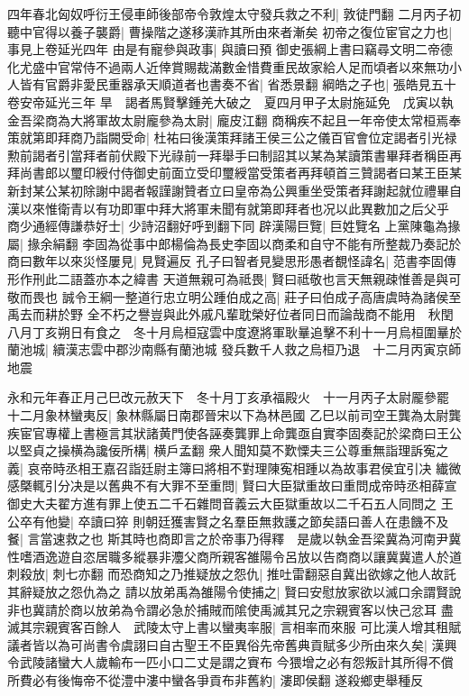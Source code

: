 四年春北匈奴呼衍王侵車師後部帝令敦煌太守發兵救之不利|{
	敦徒門翻}
二月丙子初聽中官得以養子襲爵|{
	曹操階之遂移漢祚其所由來者漸矣}
初帝之復位宦官之力也|{
	事見上卷延光四年}
由是有寵參與政事|{
	與讀曰預}
御史張綱上書曰竊尋文明二帝德化尤盛中官常侍不過兩人近倖賞賜裁滿數金惜費重民故家給人足而頃者以來無功小人皆有官爵非愛民重器承天順道者也書奏不省|{
	省悉景翻}
綱皓之子也|{
	張皓見五十卷安帝延光三年}
旱　謁者馬賢擊鍾羌大破之　夏四月甲子太尉施延免　戊寅以執金吾梁商為大將軍故太尉龐參為太尉|{
	龐皮江翻}
商稱疾不起且一年帝使太常桓焉奉策就第即拜商乃詣闕受命|{
	杜祐曰後漢策拜諸王侯三公之儀百官會位定謁者引光禄勲前謁者引當拜者前伏殿下光祿前一拜舉手曰制詔其以某為某讀策書畢拜者稱臣再拜尚書郎以璽印綬付侍御史前面立受印璽綬當受策者再拜頓首三贊謁者曰某王臣某新封某公某初除謝中謁者報謹謝贊者立曰皇帝為公興重坐受策者拜謝起就位禮畢自漢以來惟衛青以有功即軍中拜大將軍未聞有就第即拜者也况以此異數加之后父乎}
商少通經傳謙恭好士|{
	少詩沼翻好呼到翻下同}
辟漢陽巨覽|{
	巨姓覽名}
上黨陳龜為掾屬|{
	掾余絹翻}
李固為從事中郎楊倫為長史李固以商柔和自守不能有所整裁乃奏記於商曰數年以來災怪屢見|{
	見賢遍反}
孔子曰智者見變思形愚者覩怪諱名|{
	范書李固傳形作刑此二語蓋亦本之緯書}
天道無親可為祗畏|{
	賢曰祗敬也言天無親疎惟善是與可敬而畏也}
誠令王綱一整道行忠立明公踵伯成之高|{
	莊子曰伯成子高唐虞時為諸侯至禹去而耕於野}
全不朽之譽豈與此外戚凡輩耽榮好位者同日而論哉商不能用　秋閏八月丁亥朔日有食之　冬十月烏桓寇雲中度遼將軍耿曅追擊不利十一月烏桓圍曅於蘭池城|{
	續漢志雲中郡沙南縣有蘭池城}
發兵數千人救之烏桓乃退　十二月丙寅京師地震

永和元年春正月己巳改元赦天下　冬十月丁亥承福殿火　十一月丙子太尉龎參罷　十二月象林蠻夷反|{
	象林縣屬日南郡晉宋以下為林邑國}
乙巳以前司空王龔為太尉龔疾宦官專權上書極言其狀諸黄門使各誣奏龔罪上命龔亟自實李固奏記於梁商曰王公以堅貞之操横為讒佞所構|{
	横戶孟翻}
衆人聞知莫不歎慄夫三公尊重無詣理訴寃之義|{
	哀帝時丞相王嘉召詣廷尉主簿曰將相不對理陳寃相踵以為故事君侯宜引决}
纎微感槩輒引分决是以舊典不有大罪不至重問|{
	賢曰大臣獄重故曰重問成帝時丞相薛宣御史大夫翟方進有罪上使五二千石雜問音義云大臣獄重故以二千石五人同問之}
王公卒有他變|{
	卒讀曰猝}
則朝廷獲害賢之名羣臣無救護之節矣語曰善人在患饑不及餐|{
	言當速救之也}
斯其時也商即言之於帝事乃得釋　是歲以執金吾梁冀為河南尹冀性嗜酒逸遊自恣居職多縱暴非灋父商所親客雒陽令呂放以告商商以讓冀冀遣人於道刺殺放|{
	刺七亦翻}
而恐商知之乃推疑放之怨仇|{
	推吐雷翻惡自冀出欲嫁之他人故託其辭疑放之怨仇為之}
請以放弟禹為雒陽令使捕之|{
	賢曰安慰放家欲以滅口余謂賢說非也冀請於商以放弟為令謂必急於捕賊而隂使禹滅其兄之宗親賓客以快己忿耳}
盡滅其宗親賓客百餘人　武陵太守上書以蠻夷率服|{
	言相率而來服}
可比漢人增其租賦議者皆以為可尚書令虞詡曰自古聖王不臣異俗先帝舊典貢賦多少所由來久矣|{
	漢興令武陵諸蠻大人歲輸布一匹小口二丈是謂之賨布}
今猥增之必有怨叛計其所得不償所費必有後悔帝不從澧中漊中蠻各爭貢布非舊約|{
	漊即侯翻}
遂殺鄉吏舉種反

